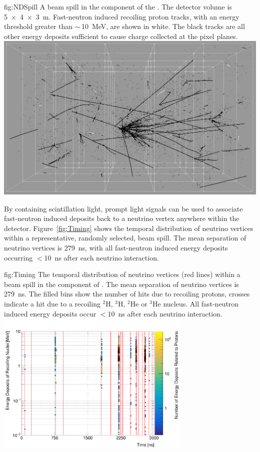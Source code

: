 \begin{dunefigure}{fig:NDSpill}
{A beam spill in the  component of the  . 
		The detector volume is \SI[product-units=repeat]{5x4x3}{\metre}.
		Fast-neutron induced recoiling proton tracks, with an energy threshold greater than $\sim\,$\SI{10}{\mega\electronvolt}, are shown in white.
		The black tracks are all other energy deposits sufficient to cause charge collected at the pixel planes.}
\includegraphics[width=.7\textwidth]{graphics/NeutronNDSpill.png}
\end{dunefigure}

By containing scintillation light, prompt light signals can be used to associate fast-neutron induced deposits back to a neutrino vertex anywhere within the detector.
Figure~\ref{fig:Timing} shows the temporal distribution of neutrino vertices within a representative, randomly selected, beam spill.
The mean separation of neutrino vertices is \SI{279}{\nano\second}, with all fast-neutron induced energy deposits occurring $<$\SI{10}{\nano\second} after each neutrino interaction.      


\begin{dunefigure} %
{fig:Timing}
{The temporal distribution of neutrino vertices (red lines) within a beam spill in the  component of  .
		The mean separation of neutrino vertices is \SI{279}{\nano\second}. The filled bins show the number of hits due to recoiling protons, crosses indicate a hit due to a recoiling $^{2}$H, $^3$H, $^2$He or $^3$He nucleus.
		All fast-neutron induced energy deposits occur $<$\SI{10}{\nano\second} after each neutrino interaction.}
\includegraphics[width=0.7\textwidth]{graphics/recoil_proton_edep_vs_vtx_time_a.png}
\end{dunefigure}
	
